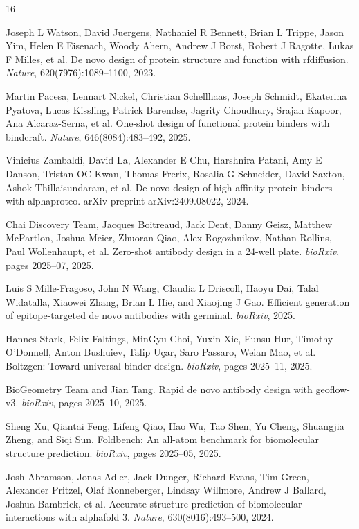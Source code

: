 \documentclass[11pt]{article}
\begin{document}
\begin{thebibliography}{16}

 Joseph L Watson, David Juergens, Nathaniel R Bennett, Brian L Trippe, Jason Yim, Helen E Eisenach, Woody Ahern, Andrew J Borst, Robert J Ragotte, Lukas F Milles, et al. De novo design of protein structure and function with rfdiffusion. \emph{Nature}, 620(7976):1089--1100, 2023.

 Martin Pacesa, Lennart Nickel, Christian Schellhaas, Joseph Schmidt, Ekaterina Pyatova, Lucas Kissling, Patrick Barendse, Jagrity Choudhury, Srajan Kapoor, Ana Alcaraz-Serna, et al. One-shot design of functional protein binders with bindcraft. \emph{Nature}, 646(8084):483--492, 2025.

 Vinicius Zambaldi, David La, Alexander E Chu, Harshnira Patani, Amy E Danson, Tristan OC Kwan, Thomas Frerix, Rosalia G Schneider, David Saxton, Ashok Thillaisundaram, et al. De novo design of high-affinity protein binders with alphaproteo. arXiv preprint arXiv:2409.08022, 2024.

 Chai Discovery Team, Jacques Boitreaud, Jack Dent, Danny Geisz, Matthew McPartlon, Joshua Meier, Zhuoran Qiao, Alex Rogozhnikov, Nathan Rollins, Paul Wollenhaupt, et al. Zero-shot antibody design in a 24-well plate. \emph{bioRxiv}, pages 2025--07, 2025.

 Luis S Mille-Fragoso, John N Wang, Claudia L Driscoll, Haoyu Dai, Talal Widatalla, Xiaowei Zhang, Brian L Hie, and Xiaojing J Gao. Efficient generation of epitope-targeted de novo antibodies with germinal. \emph{bioRxiv}, 2025.

 Hannes Stark, Felix Faltings, MinGyu Choi, Yuxin Xie, Eunsu Hur, Timothy O'Donnell, Anton Bushuiev, Talip U\c{c}ar, Saro Passaro, Weian Mao, et al. Boltzgen: Toward universal binder design. \emph{bioRxiv}, pages 2025--11, 2025.

 BioGeometry Team and Jian Tang. Rapid de novo antibody design with geoflow-v3. \emph{bioRxiv}, pages 2025--10, 2025.

 Sheng Xu, Qiantai Feng, Lifeng Qiao, Hao Wu, Tao Shen, Yu Cheng, Shuangjia Zheng, and Siqi Sun. Foldbench: An all-atom benchmark for biomolecular structure prediction. \emph{bioRxiv}, pages 2025--05, 2025.

 Josh Abramson, Jonas Adler, Jack Dunger, Richard Evans, Tim Green, Alexander Pritzel, Olaf Ronneberger, Lindsay Willmore, Andrew J Ballard, Joshua Bambrick, et al. Accurate structure prediction of biomolecular interactions with alphafold 3. \emph{Nature}, 630(8016):493--500, 2024.


\end{thebibliography}
\end{document}
